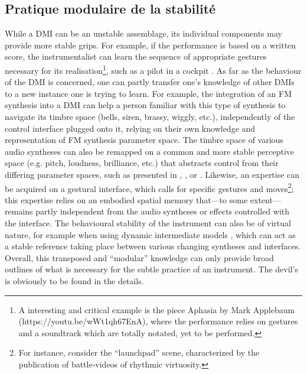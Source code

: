 \subsection{Pratique modulaire de la stabilité}
While a DMI can be an unstable assemblage, its individual components may provide more stable grips. For example, if the performance is based on a written score, the instrumentalist can learn the sequence of appropriate gestures necessary for its realisation\footnote{A interesting and critical example is the piece Aphasia by Mark Applebaum (https://youtu.be/wWt1qh67EnA), where the performance relies on gestures and a soundtrack which are totally notated, yet to be performed.}, such as a pilot in a cockpit \cite{vertegaal_towards_1996}.
	As far as the behaviour of the DMI is concerned, one can partly transfer one's knowledge of other DMIs to a new instance one is trying to learn. For example, the integration of an FM synthesis into a DMI can help a person familiar with this type of synthesis to navigate its timbre space (bells, siren, brassy, wiggly, etc.), independently of the control interface plugged onto it, relying on their own knowledge and representation of FM synthesis parameter space. The timbre space of various audio syntheses can also be remapped on a common and more stable perceptive space (e.g. pitch, loudness, brilliance, etc.) that abstracts control from their differing parameter spaces, such as presented in \cite{wessel_timbre_1979}, \cite{arfib_strategies_2002}, \cite{schwarz_sound_2012} or \cite{tubb_divergent_2014}.
	Likewise, an expertise can be acquired on a gestural interface, which calls for specific gestures and moves\footnote{For instance, consider the “launchpad” scene, characterized by the publication of battle-videos of rhythmic virtuosity.}; this expertise relies on an embodied spatial memory that—to some extent— remains partly independent from the audio syntheses or effects controlled with the interface. The behavioural stability of the instrument can also be of virtual nature, for example when using dynamic intermediate models \cite{goudard_dynamic_2011}, which can act as a stable reference taking place between various changing syntheses and interfaces.
	Overall, this transposed and “modular” knowledge can only provide broad outlines of what is necessary for the subtle practice of an instrument. The devil's is obviously to be found in the details.


